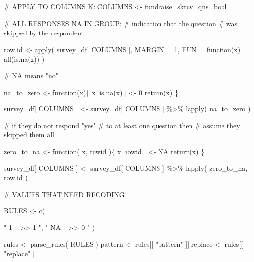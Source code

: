 \documentclass[
  letterpaper,
]{scrbook}
\newenvironment{Shaded}{\begin{snugshade}}{\end{snugshade}}
\newcommand{\AttributeTok}[1]{\textcolor[rgb]{0.40,0.45,0.13}{#1}}
\newcommand{\CommentTok}[1]{\textcolor[rgb]{0.37,0.37,0.37}{#1}}
\newcommand{\ConstantTok}[1]{\textcolor[rgb]{0.56,0.35,0.01}{#1}}
\newcommand{\ControlFlowTok}[1]{\textcolor[rgb]{0.00,0.23,0.31}{#1}}
\newcommand{\DecValTok}[1]{\textcolor[rgb]{0.68,0.00,0.00}{#1}}
\newcommand{\FunctionTok}[1]{\textcolor[rgb]{0.28,0.35,0.67}{#1}}
\newcommand{\NormalTok}[1]{\textcolor[rgb]{0.00,0.23,0.31}{#1}}
\newcommand{\OtherTok}[1]{\textcolor[rgb]{0.00,0.23,0.31}{#1}}
\newcommand{\SpecialCharTok}[1]{\textcolor[rgb]{0.37,0.37,0.37}{#1}}
\newcommand{\StringTok}[1]{\textcolor[rgb]{0.13,0.47,0.30}{#1}}
\begin{document}
\begin{Shaded}
\begin{Highlighting}[]
\CommentTok{\# APPLY TO COLUMNS K:}
\NormalTok{COLUMNS }\OtherTok{\textless{}{-}}\NormalTok{  fundraise\_skrcv\_qns\_bool}


\CommentTok{\# ALL RESPONSES NA IN GROUP:}
\CommentTok{\# indication that the question}
\CommentTok{\# was skipped by the respondent}

\NormalTok{row.id }\OtherTok{\textless{}{-}} \FunctionTok{apply}\NormalTok{( survey\_df[ COLUMNS ], }
                 \AttributeTok{MARGIN =} \DecValTok{1}\NormalTok{, }
                 \AttributeTok{FUN =} \ControlFlowTok{function}\NormalTok{(x) }\FunctionTok{all}\NormalTok{(}\FunctionTok{is.na}\NormalTok{(x)) ) }

\CommentTok{\# NA means "no"}

\NormalTok{na\_to\_zero }\OtherTok{\textless{}{-}} \ControlFlowTok{function}\NormalTok{(x)\{}
\NormalTok{  x[ }\FunctionTok{is.na}\NormalTok{(x) ] }\OtherTok{\textless{}{-}} \DecValTok{0}
  \FunctionTok{return}\NormalTok{(x)}
\NormalTok{\}}

\NormalTok{survey\_df[ COLUMNS ] }\OtherTok{\textless{}{-}} 
\NormalTok{  survey\_df[ COLUMNS ] }\SpecialCharTok{\%\textgreater{}\%} 
  \FunctionTok{lapply}\NormalTok{( na\_to\_zero )}

\CommentTok{\# if they do not respond "yes" }
\CommentTok{\# to at least one question then}
\CommentTok{\# assume they skipped them all}

\NormalTok{zero\_to\_na }\OtherTok{\textless{}{-}} \ControlFlowTok{function}\NormalTok{( x, rowid )\{}
\NormalTok{  x[ rowid ] }\OtherTok{\textless{}{-}} \ConstantTok{NA}
  \FunctionTok{return}\NormalTok{(x)}
\NormalTok{\}}

\NormalTok{survey\_df[ COLUMNS ] }\OtherTok{\textless{}{-}} 
\NormalTok{  survey\_df[ COLUMNS ] }\SpecialCharTok{\%\textgreater{}\%} 
  \FunctionTok{lapply}\NormalTok{( zero\_to\_na, row.id )}



\CommentTok{\# VALUES THAT NEED RECODING}

\NormalTok{RULES }\OtherTok{\textless{}{-}} \FunctionTok{c}\NormalTok{(    }
  
  \StringTok{"    1      =\textgreater{}\textgreater{}    1    "}\NormalTok{, }
  \StringTok{"   NA      =\textgreater{}\textgreater{}    0    "}\NormalTok{    )}


\NormalTok{rules }\OtherTok{\textless{}{-}} \FunctionTok{parse\_rules}\NormalTok{( RULES )          }
\NormalTok{pattern }\OtherTok{\textless{}{-}}\NormalTok{ rules[[ }\StringTok{"pattern"}\NormalTok{ ]]}
\NormalTok{replace }\OtherTok{\textless{}{-}}\NormalTok{ rules[[ }\StringTok{"replace"}\NormalTok{ ]]}


\end{Highlighting}
\end{Shaded}
\end{document}
